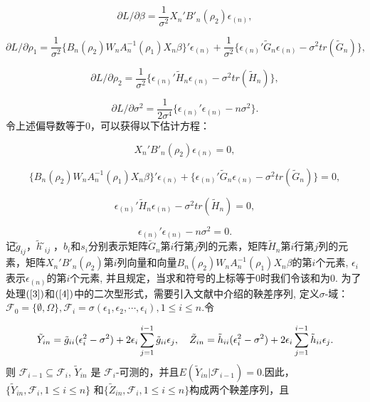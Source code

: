 \documentclass[a4paper,c5size,onecolumn,twoside,cap,Chinese]{APSart}
\begin{document}
$$ \partial L/\partial \beta = \frac{1}{\sigma^{2}}X_n'B'_n(\rho_2)\epsilon_{(n)}, $$

$$ \partial L/\partial \rho_1 = \frac{1}{\sigma^{2}}\{B_n (\rho_2 )W_nA_n^{-1} (\rho_1 )X_n\beta  \}'\epsilon_{(n)}+\frac{1}{\sigma^{2}}\{\epsilon_{(n)}'\tilde{G}_n\epsilon_{(n)} -\sigma^{2}tr(\tilde{G}_n)\}, $$

$$ \partial L/\partial \rho_2 = \frac{1}{\sigma^{2}}\{\epsilon_{(n)}'\tilde{H}_n\epsilon_{(n)} -\sigma^{2}tr(\tilde{H}_n)\}, $$

$$ \partial L/\partial \sigma^{2} = \frac{1}{2\sigma^{4}}\{\epsilon_{(n)}'\epsilon_{(n)} -n\sigma^{2}\}. $$
令上述偏导数等于0，可以获得以下估计方程：


\begin{equation}
    X_n'B'_n(\rho_2)\epsilon_{(n)} =0,\label{2}
\end{equation}

\begin{equation}
    \{B_n (\rho_2 )W_nA_n^{-1} (\rho_1 )X_n\beta  \}'\epsilon_{(n)}+\{\epsilon_{(n)}'\tilde{G}_n\epsilon_{(n)} -\sigma^{2}tr(\tilde{G}_n)\}=0,\label{3}
\end{equation}

\begin{equation}
    \epsilon_{(n)}'\tilde{H}_n\epsilon_{(n)} -\sigma^{2}tr(\tilde{H}_n)=0, \label{4}
\end{equation}    
    
\begin{equation}
    \epsilon_{(n)}'\epsilon_{(n)} -n\sigma^{2}=0. \label{5}
\end{equation}
记$\tilde{g}_{ij}$，$\tilde{h} ̃_{ij}$，$b_i$和$s_i$分别表示矩阵$\tilde{G}_n$第$i$行第$j$列的元素，矩阵$\tilde{H}_n$第$i$行第$j$列的元素，矩阵$X_n'B'_n(\rho_2)$第$i$列向量和向量$B_n (\rho_2 )W_nA_n^{-1} (\rho_1 )X_n\beta $的第$i$个元素, $\epsilon_i$表示$\epsilon_{(n)}$的第$i$个元素, 并且规定，当求和符号的上标等于0时我们令该和为0. 为了处理$\rm(\ref{3}) $和$\rm(\ref{4}) $中的二次型形式，需要引入文献中介绍的鞅差序列, 定义$\sigma$-域：${\mathcal{F}}_{0}=\{ {\emptyset}, \Omega\}, {\mathcal{F}}_{i}=\sigma(\epsilon_{1}, \epsilon_{2}, \cdots, \epsilon_i), 1\leq i\leq n$.令

\begin{equation}
    \tilde{Y}_{in} =\tilde{g}_{ii} (\epsilon_i^2-\sigma^2 )+2\epsilon_i\sum_{j=1}^{i-1} \tilde{g}_{ii}\epsilon_j, \quad  \tilde{Z}_{in} =\tilde{h}_{ii} (\epsilon_i^2-\sigma^2 )+2\epsilon_i\sum_{j=1}^{i-1} \tilde{h}_{ii}\epsilon_j. \label{6}\\
\end{equation}
则 $ {\mathcal{F}}_{i-1}  \subseteq {\mathcal{F}}_{i}$, $\tilde{Y}_{in}$ 是 ${\mathcal{F}}_{i}$-可测的，并且$E(\tilde{Y}_{in}|{\mathcal{F}}_{i-1})=0$.因此，$\{\tilde{Y}_{in}, {\mathcal{F}}_{i}, 1 \leq i\leq n\}$ 和$\{\tilde{Z}_{in}, {\mathcal{F}}_{i}, 1 \leq i\leq n\}$构成两个鞅差序列，且
\end{document}
